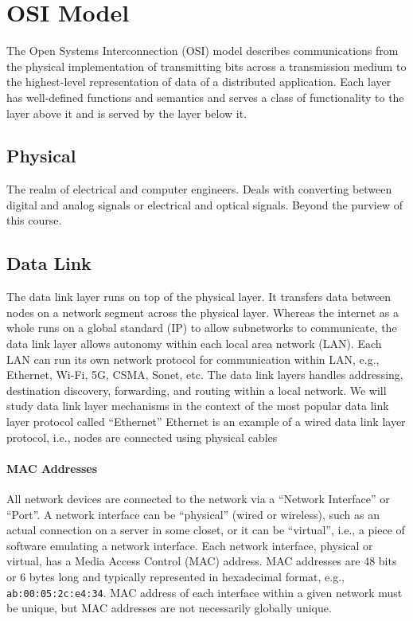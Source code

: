 \section{OSI Model}

The Open Systems Interconnection (OSI) model describes
communications from the physical implementation of
transmitting bits across a transmission medium to the
highest-level representation of data of a distributed
application. Each layer has well-defined functions and
semantics and serves a class of functionality to the
layer above it and is served by the layer below it.

\subsection{Physical}

The realm of electrical and computer engineers.
Deals with converting between digital and analog signals or
electrical and optical signals. Beyond the purview of
this course.

\subsection{Data Link}
The data link layer runs on top of the physical layer.
It transfers data between nodes on a network segment
across the physical layer. Whereas the internet as a whole
runs on a global standard (IP) to allow subnetworks to
communicate, the data link layer allows autonomy
within each local area network (LAN).
Each LAN can run its own network
protocol for communication within LAN,
e.g., Ethernet, Wi-Fi, 5G, CSMA, Sonet, etc.
The data link layers handles addressing,
destination discovery, forwarding, and routing within
a local network. We will study data link layer mechanisms in the
context of the most popular data link layer protocol
called “Ethernet”
Ethernet is an example of a wired data link layer protocol,
i.e., nodes are connected using physical cables

\paragraph{MAC Addresses}

All network devices are connected to the network via a
“Network Interface” or “Port”. A network interface can be
“physical” (wired or wireless), such as an actual connection
on a server in some closet, or it can be “virtual”, i.e., a
piece of software emulating a network interface.
Each network interface, physical or virtual, has a Media Access
Control (MAC) address. MAC addresses are 48 bits or 6 bytes long and
typically represented in hexadecimal format, e.g., \texttt{ab:00:05:2c:e4:34}.
MAC address of each interface within a given network must be unique,
but MAC addresses are not necessarily globally unique.

